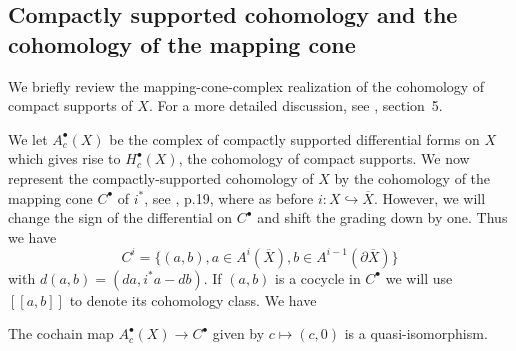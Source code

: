 \subsection{Compactly supported cohomology and the cohomology of
the mapping cone}\label{mappingconesection}

\vskip 0.5in

We briefly review the mapping-cone-complex realization of the
cohomology of compact supports of $X$. For a more detailed discussion,
see \cite{FMspec}, section~5.

\vskip 0.5in

We let $A_c^{\bullet}(X)$ be the complex of compactly supported
differential forms on $X$ which gives rise to $H_c^{\bullet}(X)$,
the cohomology of compact supports. We now represent the
compactly-supported cohomology of $X$ by the cohomology of the
mapping cone $C^{\bullet}$ of $i^*$, see \cite{Weibel}, p.19, where
as before $i: X \hookrightarrow \overline{X}$. However, we will
change the sign of the differential on $C^{\bullet}$ and shift the
grading down by one. Thus we have $$C^i =\{ (a,b), a \in A^i
(\overline{X}), b \in A^{i-1}(\partial \overline{X})\}$$ with $d(a,b)
= (da, i^*a - db)$.  If $(a,b)$ is a cocycle in $C^{\bullet}$ we
will use $[[a,b]]$ to denote its cohomology class. We have
\begin{proposition} \label{quasiiso} The cochain map $A_c^{\bullet}(X)
\to C^{\bullet}$ given by $c \mapsto (c,0)$ is a quasi-isomorphism.
\end{proposition}

\vskip 0.5in

